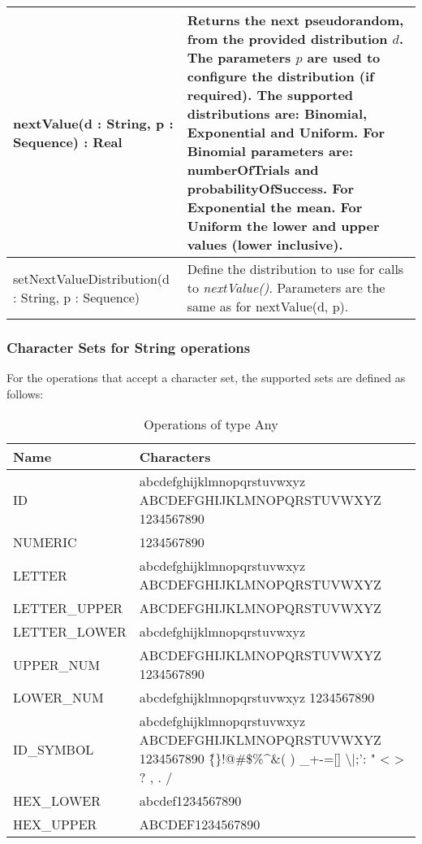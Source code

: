 \begin{longtabu} {|p{6.5cm}|X|}
    nextValue(d : String, p : Sequence) : Real & Returns the next pseudorandom, from the provided distribution $d$. The parameters $p$ are used to configure the distribution (if required). The supported distributions are: Binomial, Exponential and Uniform.  For Binomial parameters are: numberOfTrials and probabilityOfSuccess. For Exponential the mean. For Uniform the lower and upper values (lower inclusive).\\\hline
    
    setNextValueDistribution(d : String, p : Sequence)  & Define the distribution to use for calls to \emph{nextValue()}. Parameters are the same as for nextValue(d, p). \\\hline
    
\end{longtabu}

\subsubsection{Character Sets for String operations}\label{sec:emg.charsets}

For the operations that accept a character set, the supported sets are defined as follows:
\begin{longtabu} {|p{6.5cm}|X|}
\caption{Operations of type Any}
\label{tab:charsets}\\
\hline
\textbf{Name} & \textbf{Characters} \\\hline
ID							 & abcdefghijklmnopqrstuvwxyz ABCDEFGHIJKLMNOPQRSTUVWXYZ 1234567890\\\hline
NUMERIC			  	  & 1234567890\\\hline
LETTER 					& abcdefghijklmnopqrstuvwxyz ABCDEFGHIJKLMNOPQRSTUVWXYZ\\\hline
LETTER\_UPPER 	  & ABCDEFGHIJKLMNOPQRSTUVWXYZ\\\hline
LETTER\_LOWER	 & abcdefghijklmnopqrstuvwxyz\\\hline
UPPER\_NUM         & ABCDEFGHIJKLMNOPQRSTUVWXYZ 1234567890\\\hline
LOWER\_NUM        & abcdefghijklmnopqrstuvwxyz 1234567890\\\hline
ID\_SYMBOL 			 & abcdefghijklmnopqrstuvwxyz ABCDEFGHIJKLMNOPQRSTUVWXYZ 1234567890 \~\{\}!@\#\$\%\textasciicircum\&\textasteriskcentered( ) \_+-=[] \textbackslash {}|;': " < > ? , . /  \\\hline     %
HEX\_LOWER 		   & abcdef1234567890\\\hline
HEX\_UPPER 			& ABCDEF1234567890\\\hline
\end{longtabu}

